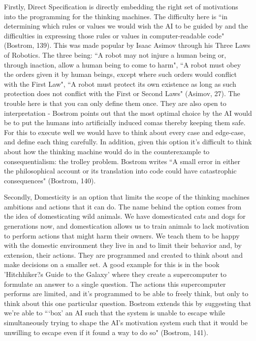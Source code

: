\documentclass[11pt, oneside]{article}
\begin{document}
\par Firstly, Direct Specification is directly embedding the right set of motivations into the programming for the thinking machines. The difficulty here is ``in determining which rules or values we would wish the AI to be guided by and the difficulties in expressing those rules or values in computer-readable code" (Bostrom, 139). This was made popular by Isaac Asimov through his Three Laws of Robotics. The three being: ``A robot may not injure a human being or, through inaction, allow a human being to come to harm", ``A robot must obey the orders given it by human beings, except where such orders would conflict with the First Law", ``A robot must protect its own existence as long as such protection does not conflict with the First or Second Laws" (Asimov, 27). The trouble here is that you can only define them once. They are also open to interpretation - Bostrom points out that the most optimal choice by the AI would be to put the humans into artificially induced comas thereby keeping them safe. For this to execute well we would have to think about every case and edge-case, and define each thing carefully. In addition, given this option it's difficult to think about how the thinking machine would do in the counterexample to consequentialism: the trolley problem. Bostrom writes ``A small error in either the philosophical account or its translation into code could have catastrophic consequences" (Bostrom, 140).
 
\par Secondly, Domesticity is an option that limits the scope of the thinking machines ambitions and actions that it can do. The name behind the option comes from the idea of domesticating wild animals. We have domesticated cats and dogs for generations now, and domestication allows us to train animals to lack motivation to perform actions that might harm their owners. We teach them to be happy with the domestic environment they live in and to limit their behavior and, by extension, their actions. They are programmed and created to think about and make decisions on a smaller set. A good example for this is in the book 'Hitchhiker?s Guide to the Galaxy' where they create a supercomputer to formulate an answer to a single question. The actions this supercomputer performs are limited, and it's programmed to be able to freely think, but only to think about this one particular question. Bostrom extends this by suggesting that we're able to ```box' an AI such that the system is unable to escape while simultaneously trying to shape the AI's motivation system such that it would be unwilling to escape even if it found a way to do so" (Bostrom, 141).
 
\end{document}
